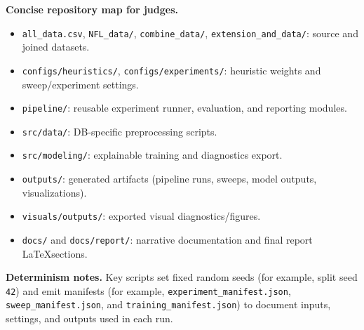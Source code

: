 \textbf{Concise repository map for judges.}
\begin{itemize}
  \item \texttt{all\_data.csv}, \texttt{NFL\_data/}, \texttt{combine\_data/}, \texttt{extension\_and\_data/}: source and joined datasets.
  \item \texttt{configs/heuristics/}, \texttt{configs/experiments/}: heuristic weights and sweep/experiment settings.
  \item \texttt{pipeline/}: reusable experiment runner, evaluation, and reporting modules.
  \item \texttt{src/data/}: DB-specific preprocessing scripts.
  \item \texttt{src/modeling/}: explainable training and diagnostics export.
  \item \texttt{outputs/}: generated artifacts (pipeline runs, sweeps, model outputs, visualizations).
  \item \texttt{visuals/outputs/}: exported visual diagnostics/figures.
  \item \texttt{docs/} and \texttt{docs/report/}: narrative documentation and final report \LaTeX sections.
\end{itemize}

\textbf{Determinism notes.} Key scripts set fixed random seeds (for example, split seed \texttt{42}) and emit manifests (for example, \texttt{experiment\_manifest.json}, \texttt{sweep\_manifest.json}, and \texttt{training\_manifest.json}) to document inputs, settings, and outputs used in each run.
